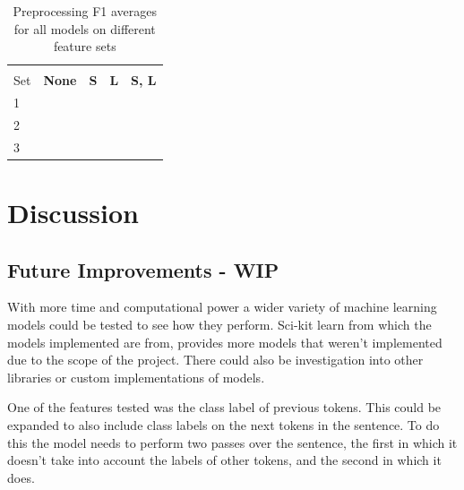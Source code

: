 \documentclass[11pt,oneside]{book}
\begin{document}
\begin{longtable}[c]{|l|l|l|l|l|}
\caption{Preprocessing F1 averages for all models on different feature sets}
\label{tab:ner_re_preprocessing}\\
\hline
\textbf{\begin{tabular}[c]{@{}l@{}}Feature \\ Set\end{tabular}} & \multicolumn{1}{c|}{\textbf{None}} & \multicolumn{1}{c|}{\textbf{S}} & \multicolumn{1}{c|}{\textbf{L}} & \multicolumn{1}{c|}{\textbf{S, L}} \\ \hline
\endfirsthead
%
\endhead
%
1                                                               & \multicolumn{1}{c|}{}              & \multicolumn{1}{c|}{}           &                                 &                                    \\ \hline
2                                                               &                                    &                                 &                                 &                                    \\ \hline
3                                                               &                                    &                                 &                                 &                                    \\ \hline
\end{longtable}

\chapter{Discussion}

\section{Future Improvements - WIP}
With more time and computational power a wider variety of machine learning models could be tested to see how they perform. Sci-kit learn from which the models implemented are from, provides more models that weren't implemented due to the scope of the project. There could also be investigation into other libraries or custom implementations of models.

One of the features tested was the class label of previous tokens. This could be expanded to also include class labels on the next tokens in the sentence. To do this the model needs to perform two passes over the sentence, the first in which it doesn't take into account the labels of other tokens, and the second in which it does.
\end{document}
